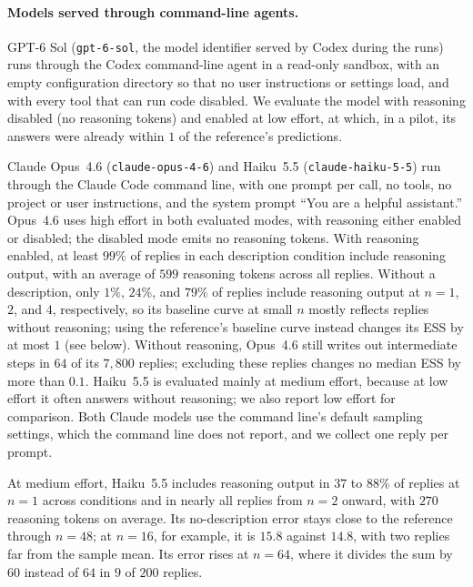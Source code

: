 \paragraph{Models served through command-line agents.}
GPT-6 Sol (\texttt{gpt-6-sol}, the model identifier served by Codex during the runs) runs through the Codex command-line agent in a read-only sandbox, with an empty configuration directory so that no user instructions or settings load, and with every tool that can run code disabled. We evaluate the model with reasoning disabled (no reasoning tokens) and enabled at low effort, at which, in a pilot, its answers were already within $1$ of the reference's predictions.

Claude Opus~4.6 (\texttt{claude-opus-4-6}) and Haiku~5.5 (\texttt{claude-haiku-5-5}) run through the Claude Code command line, with one prompt per call, no tools, no project or user instructions, and the system prompt ``You are a helpful assistant.'' Opus~4.6 uses high effort in both evaluated modes, with reasoning either enabled or disabled; the disabled mode emits no reasoning tokens. With reasoning enabled, at least $99\%$ of replies in each description condition include reasoning output, with an average of $599$ reasoning tokens across all replies. Without a description, only $1\%$, $24\%$, and $79\%$ of replies include reasoning output at $n=1$, $2$, and $4$, respectively, so its baseline curve at small $n$ mostly reflects replies without reasoning; using the reference's baseline curve instead changes its ESS by at most $1$ (see below). Without reasoning, Opus~4.6 still writes out intermediate steps in $64$ of its $7{,}800$ replies; excluding these replies changes no median ESS by more than $0.1$. Haiku~5.5 is evaluated mainly at medium effort, because at low effort it often answers without reasoning; we also report low effort for comparison. Both Claude models use the command line's default sampling settings, which the command line does not report, and we collect one reply per prompt.

At medium effort, Haiku~5.5 includes reasoning output in $37$ to $88\%$ of replies at $n = 1$ across conditions and in nearly all replies from $n = 2$ onward, with $270$ reasoning tokens on average. Its no-description error stays close to the reference through $n = 48$; at $n = 16$, for example, it is $15.8$ against $14.8$, with two replies far from the sample mean. Its error rises at $n = 64$, where it divides the sum by $60$ instead of $64$ in $9$ of $200$ replies.


